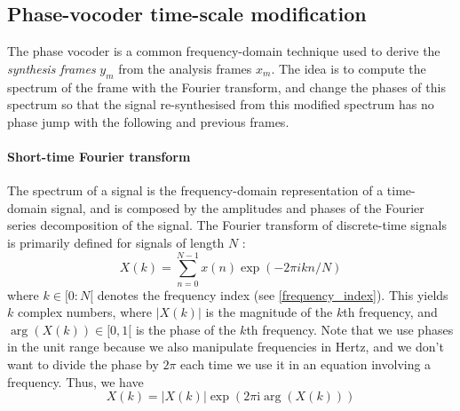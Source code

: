 \documentclass[letterpaper]{article}
\theoremstyle{definition}
\theoremstyle{remark}
\theoremstyle{plain}
\begin{document}
\subsection{Phase-vocoder time-scale modification}
The phase vocoder is a common frequency-domain technique used to derive the
\emph{synthesis frames} \(y_m\)  from the analysis frames \(x_m\). The idea
is to compute the spectrum of the frame with the Fourier transform, and change
the phases of this spectrum so that the signal re-synthesised from this modified
spectrum has no phase jump with the following and previous frames.
\paragraph{Short-time Fourier transform}
The spectrum of a signal is the frequency-domain representation of
a time-domain signal, and is composed by the amplitudes and phases of the
Fourier series decomposition of the signal. The Fourier transform of
discrete-time signals is primarily defined for signals of length \(N\)
\citep{bracewell1986fourier}:
\begin{equation}
	  X(k) = \sum_{n=0}^{N-1}x(n)\exp(-2\pi ikn/N)
\end{equation}
where \(k\in [0:N[\) denotes the frequency index (see \eqref{frequency_index}).
This yields \(k\) complex numbers, where \(|X(k)|\) is the magnitude of the
\(k\)th frequency, and \(\arg(X(k))\in[0,1[\) is the phase of the \(k\)th
frequency. Note that we use phases in the unit range because we also manipulate
frequencies in Hertz, and we don't want to divide the phase by \(2\pi\) each
time we use it in an equation
involving a frequency. Thus, we have
\begin{equation}
		X(k)= |X(k)|\exp(2\pi \text{i} \arg(X(k)))
\end{equation}
\end{document}
